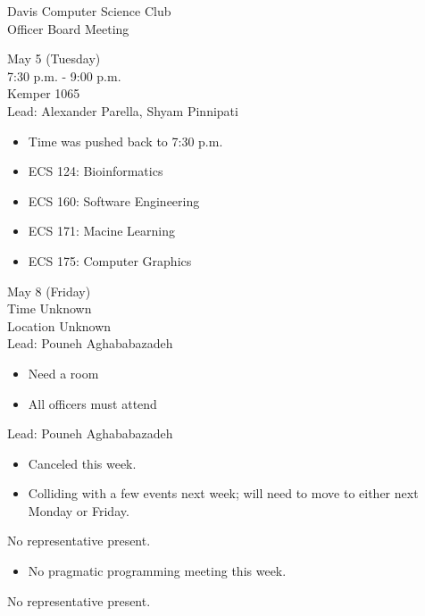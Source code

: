 \documentclass{article}
\begin{document}
\begin{Minutes}{Davis Computer Science Club\\Officer Board Meeting}

May 5 (Tuesday)\\
7:30 p.m. - 9:00 p.m.\\
Kemper 1065\\
Lead: Alexander Parella, Shyam Pinnipati

\begin{itemize}
	\item Time was pushed back to 7:30 p.m.
	\item ECS 124: Bioinformatics
	\item ECS 160: Software Engineering
	\item ECS 171: Macine Learning
	\item ECS 175: Computer Graphics
\end{itemize}


May 8 (Friday)\\
Time Unknown\\
Location Unknown\\
Lead: Pouneh Aghababazadeh

\begin{itemize}
	\item Need a room
	\item All officers must attend
\end{itemize}


Lead: Pouneh Aghababazadeh

\begin{itemize}
	\item Canceled this week.
	\item Colliding with a few events next week; will need to move to either next Monday or Friday.
\end{itemize}



No representative present.


\begin{itemize}
	\item No pragmatic programming meeting this week.
\end{itemize}


No representative present.



\end{Minutes}
\end{document}
